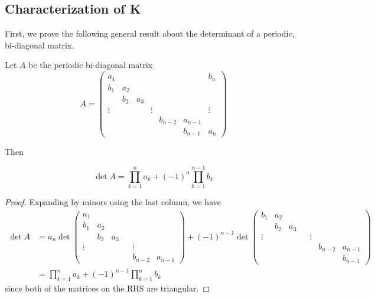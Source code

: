 \documentclass[thesis.tex]{subfiles}
\begin{document}
\subsection{Characterization of K }

First, we prove the following general result about the determinant of a periodic, bi-diagonal matrix.


\begin{lemma}\label{bidiag}
Let $A$ be the periodic bi-diagonal matrix
\begin{equation}
A = \begin{pmatrix}
a_1 & & & & & & b_n \\
b_1 & a_2 \\
& b_2 & a_3 \\
\vdots & & & \vdots & &&  \vdots \\
& & & & b_{n-2} & a_{n-1} \\
& & & & & b_{n-1} & a_n
\end{pmatrix}
\end{equation}

Then 

\begin{equation}
\det{A} = \prod_{k = 1}^n a_k + (-1)^n \prod_{k = 1}^{n-1} b_k
\end{equation}

\begin{proof}
Expanding by minors using the last column, we have
\begin{align*}
\det A &= a_n \det
\begin{pmatrix}
a_1 \\
b_1 & a_2 \\
& b_2 & a_3 \\
\vdots & & & & \vdots \\
& & & & b_{n-2} & a_{n-1}
\end{pmatrix}
+ (-1)^{n-1} \det
\begin{pmatrix}
b_1 & a_2 \\
& b_2 & a_3 \\
\vdots & & & & \vdots \\
& & & & & b_{n-2} & a_{n-1} \\
& & & & & & b_{n-1}
\end{pmatrix} \\
&= \prod_{k = 1}^n a_k + (-1)^{n-1} \prod_{k = 1}^n b_k
\end{align*}
since both of the matrices on the RHS are triangular.
\end{proof}
\end{lemma}
\end{document}
